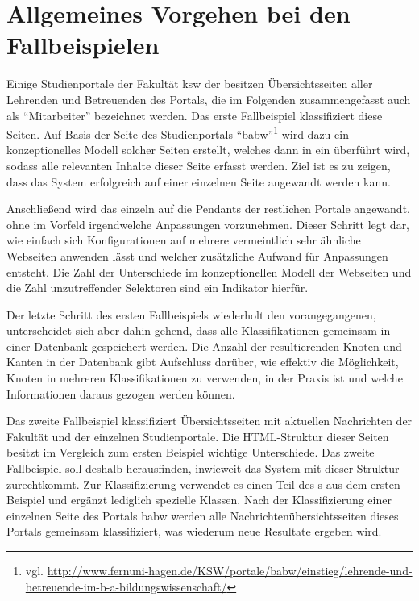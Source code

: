 \section{Allgemeines Vorgehen bei den Fallbeispielen}
    \label{section:findingsMethod}
    Einige Studienportale der Fakultät \gls{ksw} der {\fernUni}
    besitzen Übersichtsseiten aller Lehrenden und Betreuenden des Portals,
    die im Folgenden zusammengefasst auch als "`Mitarbeiter"' bezeichnet werden.
    Das erste Fallbeispiel klassifiziert diese Seiten.
    Auf Basis der Seite des Studienportals
    "`\gls{babw}"'\footnote{vgl. \url{http://www.fernuni-hagen.de/KSW/portale/babw/einstieg/lehrende-und-betreuende-im-b-a-bildungswissenschaft/}}
    wird dazu ein konzeptionelles Modell solcher Seiten erstellt,
    welches dann in ein {\classificationModel} überführt wird,
    sodass alle relevanten Inhalte dieser Seite erfasst werden.
    Ziel ist es zu zeigen, dass das System erfolgreich auf einer einzelnen Seite angewandt werden kann.

    Anschließend wird das {\classificationModel} einzeln auf die Pendants der restlichen Portale angewandt,
    ohne im Vorfeld irgendwelche Anpassungen vorzunehmen.
    Dieser Schritt legt dar, wie einfach sich Konfigurationen auf mehrere vermeintlich
    sehr ähnliche Webseiten anwenden lässt und welcher zusätzliche Aufwand für Anpassungen entsteht.
    Die Zahl der Unterschiede im konzeptionellen Modell der Webseiten und die Zahl unzutreffender Selektoren sind ein Indikator hierfür.

    Der letzte Schritt des ersten Fallbeispiels wiederholt den vorangegangenen,
    unterscheidet sich aber dahin gehend, dass alle Klassifikationen
    gemeinsam in einer Datenbank gespeichert werden.
    Die Anzahl der resultierenden Knoten und Kanten in der Datenbank
    gibt Aufschluss darüber, wie effektiv die Möglichkeit, Knoten in mehreren Klassifikationen
    zu verwenden, in der Praxis ist und welche Informationen daraus gezogen werden können.

    Das zweite Fallbeispiel klassifiziert Übersichtsseiten mit aktuellen Nachrichten
    der Fakultät und der einzelnen Studienportale.
    Die HTML-Struktur dieser Seiten besitzt im Vergleich zum ersten Beispiel wichtige Unterschiede.
    Das zweite Fallbeispiel soll deshalb herausfinden, inwieweit das System mit dieser Struktur zurechtkommt.
    Zur Klassifizierung verwendet es einen Teil des {\classificationModel}s aus dem ersten Beispiel
    und ergänzt lediglich spezielle Klassen.
    Nach der Klassifizierung einer einzelnen Seite des Portals \gls{babw}
    werden alle Nachrichtenübersichtsseiten dieses Portals gemeinsam klassifiziert,
    was wiederum neue Resultate ergeben wird.

